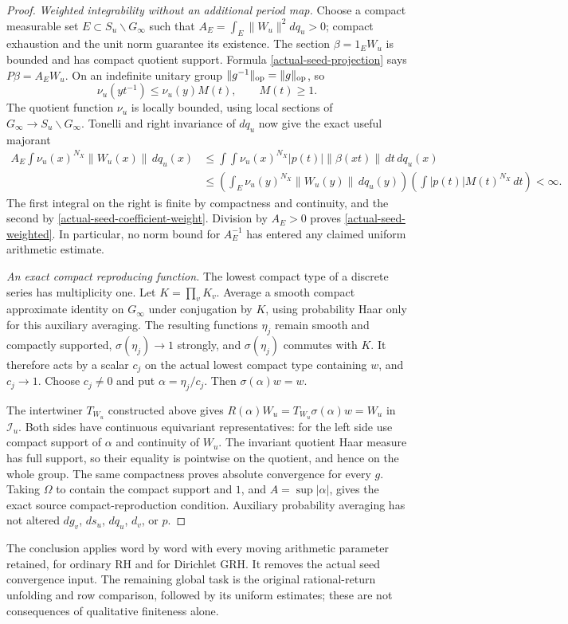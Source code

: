 \begin{proof}
\medskip\noindent\emph{Weighted integrability without an additional period map.}
Choose a compact measurable set $E\subset S_u\backslash G_\infty$
such that
$A_E=\int_E\|W_u\|^2dq_u>0$; compact exhaustion and the unit
norm guarantee its existence.  The section $\beta=1_EW_u$ is
bounded and has compact quotient support.  Formula
\eqref{actual-seed-projection} says $P\beta=A_EW_u$.
On an indefinite unitary group
$\|g^{-1}\|_{\rm op}=\|g\|_{\rm op}$, so
\[
 \nu_u(yt^{-1})\le\nu_u(y)M(t),\qquad M(t)\ge1.
\]
The quotient function $\nu_u$ is locally bounded, using local
sections of $G_\infty\to S_u\backslash G_\infty$.  Tonelli and
right invariance of $dq_u$ now give the exact useful majorant
\begin{align*}
 A_E\int\nu_u(x)^{N_X}\|W_u(x)\|\,dq_u(x)
 &\le\int\!\int\nu_u(x)^{N_X}|p(t)|\|\beta(xt)\|\,dt\,dq_u(x)\\
 &\le\left(\int_E\nu_u(y)^{N_X}\|W_u(y)\|\,dq_u(y)\right)
       \left(\int|p(t)|M(t)^{N_X}\,dt\right)<\infty.
\end{align*}
The first integral on the right is finite by compactness and
continuity, and the second by
\eqref{actual-seed-coefficient-weight}.  Division by $A_E>0$
proves \eqref{actual-seed-weighted}.  In particular, no norm bound
for $A_E^{-1}$ has entered any claimed uniform arithmetic estimate.

\medskip\noindent\emph{An exact compact reproducing function.}
The lowest compact type of a discrete series has multiplicity
one.\cite{seed-decay-lowest-type}
Let $K=\prod_v K_v$.  Average a smooth compact approximate
identity on $G_\infty$ under conjugation by $K$, using probability
Haar only for this auxiliary averaging.  The resulting functions
$\eta_j$ remain smooth and compactly supported,
$\sigma(\eta_j)\to1$ strongly, and $\sigma(\eta_j)$ commutes
with $K$.  It therefore acts by a scalar $c_j$ on the actual
lowest compact type containing $w$, and $c_j\to1$.
Choose $c_j\ne0$ and put $\alpha=\eta_j/c_j$.
Then $\sigma(\alpha)w=w$.

The intertwiner $T_{W_u}$ constructed above gives
$R(\alpha)W_u=T_{W_u}\sigma(\alpha)w=W_u$ in $\mathcal I_u$.
Both sides have continuous equivariant representatives: for
the left side use compact support of $\alpha$ and continuity
of $W_u$.  The invariant quotient Haar measure has full support,
so their equality is pointwise on the quotient, and hence on
the whole group.  The same compactness proves absolute
convergence for every $g$.  Taking $\Omega$ to contain the
compact support and $1$, and $A=\sup|\alpha|$, gives the exact
source compact-reproduction condition.  Auxiliary probability
averaging has not altered $dg_v$, $ds_u$, $dq_u$, $d_v$, or $p$.
\end{proof}

The conclusion applies word by word with every moving arithmetic
parameter retained, for ordinary RH and for Dirichlet GRH.  It
removes the actual seed convergence input.  The remaining global
task is the original rational-return unfolding and row comparison,
followed by its uniform estimates; these are not consequences of
qualitative finiteness alone.
